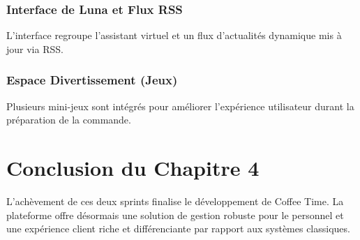 \subsubsection{Interface de Luna et Flux RSS}
L'interface regroupe l'assistant virtuel et un flux d'actualités dynamique mis à jour via RSS.

\subsubsection{Espace Divertissement (Jeux)}
Plusieurs mini-jeux sont intégrés pour améliorer l'expérience utilisateur durant la préparation de la commande.

\section*{Conclusion du Chapitre 4}
L'achèvement de ces deux sprints finalise le développement de Coffee Time. La plateforme offre désormais une solution de gestion robuste pour le personnel et une expérience client riche et différenciante par rapport aux systèmes classiques.
